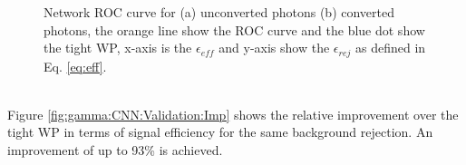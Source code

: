 \begin{figure}[htbp]
    \centering
	\begin{tcolorbox}[colback=black!5!white,colframe=white!75!black]
    \caption{Network ROC curve for (a) unconverted photons (b) converted photons, the orange line show the ROC curve and the blue dot show the tight WP, x-axis is the $\epsilon_{eff}$ and y-axis show the $\epsilon_{rej}$ as defined in Eq. \ref{eq:eff}.}
    \label{fig:gamma:CNN:Validation:ROC}
    \end{tcolorbox}
    
\end{figure}
\\
Figure \ref{fig:gamma:CNN:Validation:Imp} shows the relative improvement over the tight WP in terms of signal efficiency for the same background rejection. An improvement of up to 93\% is achieved. 

